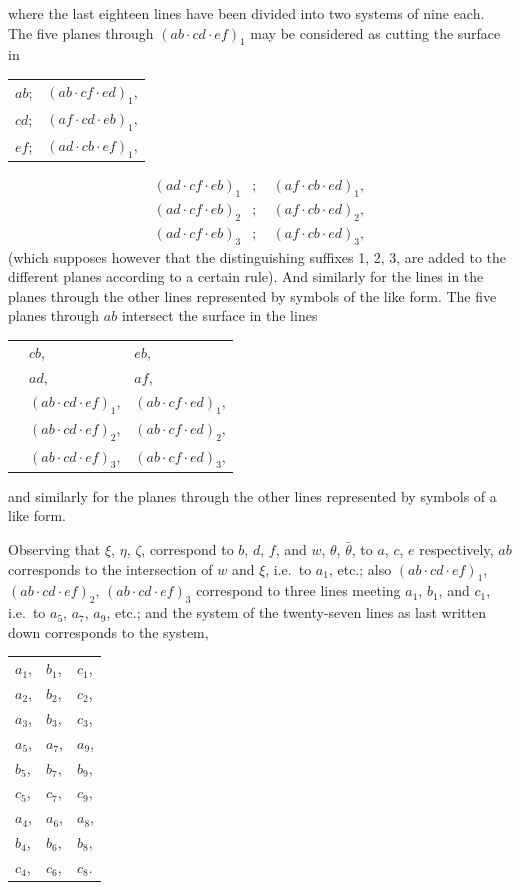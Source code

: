 \documentclass[12pt,a4paper]{article}
\begin{document}
where the last eighteen lines have been divided into two systems of nine each. The five planes through $(ab \cdot cd \cdot ef)_1$ may be considered as cutting the surface in
\begin{center}
\begin{tabular}{ll}
$ab$; & $(ab \cdot cf \cdot ed)_1$, \\
$cd$; & $(af \cdot cd \cdot eb)_1$, \\
$ef$; & $(ad \cdot cb \cdot ef)_1$,
\end{tabular}
\end{center}
\begin{align*}
(ad \cdot cf \cdot eb)_1 &;\quad (af \cdot cb \cdot ed)_1, \\
(ad \cdot cf \cdot eb)_2 &;\quad (af \cdot cb \cdot ed)_2, \\
(ad \cdot cf \cdot eb)_3 &;\quad (af \cdot cb \cdot ed)_3,
\end{align*}
(which supposes however that the distinguishing suffixes 1, 2, 3, are added to the different planes according to a certain rule). And similarly for the lines in the planes through the other lines represented by symbols of the like form. The five planes through $ab$ intersect the surface in the lines
\begin{center}
\begin{tabular}{lll}
& $cb$, & $eb$, \\
& $ad$, & $af$, \\
& $(ab \cdot cd \cdot ef)_1$, & $(ab \cdot cf \cdot ed)_1$, \\
& $(ab \cdot cd \cdot ef)_2$, & $(ab \cdot cf \cdot ed)_2$, \\
& $(ab \cdot cd \cdot ef)_3$, & $(ab \cdot cf \cdot ed)_3$,
\end{tabular}
\end{center}
and similarly for the planes through the other lines represented by symbols of a like form.

Observing that $\xi$, $\eta$, $\zeta$, correspond to $b$, $d$, $f$, and $w$, $\theta$, $\bar{\theta}$, to $a$, $c$, $e$ respectively, $ab$ corresponds to the intersection of $w$ and $\xi$, i.e.\ to $a_1$, etc.; also $(ab \cdot cd \cdot ef)_1$, $(ab \cdot cd \cdot ef)_2$, $(ab \cdot cd \cdot ef)_3$ correspond to three lines meeting $a_1$, $b_1$, and $c_1$, i.e.\ to $a_5$, $a_7$, $a_9$, etc.; and the system of the twenty-seven lines as last written down corresponds to the system,
\begin{center}
\begin{tabular}{lll}
$a_1$, & $b_1$, & $c_1$, \\
$a_2$, & $b_2$, & $c_2$, \\
$a_3$, & $b_3$, & $c_3$, \\[6pt]
$a_5$, & $a_7$, & $a_9$, \\
$b_5$, & $b_7$, & $b_9$, \\
$c_5$, & $c_7$, & $c_9$, \\[6pt]
$a_4$, & $a_6$, & $a_8$, \\
$b_4$, & $b_6$, & $b_8$, \\
$c_4$, & $c_6$, & $c_8$.
\end{tabular}
\end{center}
\end{document}
